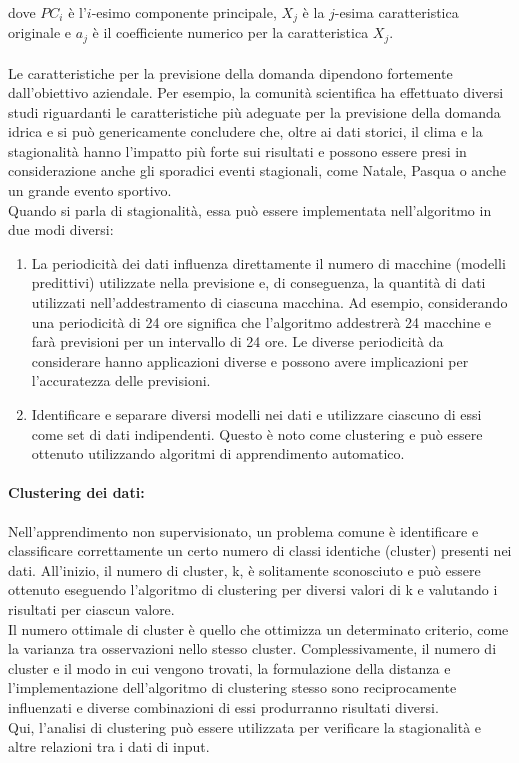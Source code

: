\documentclass[12pt,a4paper]{report}
\begin{document}
dove $PC_i$ è l'$i$-esimo componente principale, $X_j$ è la $j$-esima caratteristica originale e $a_j$ è il coefficiente numerico per la caratteristica $X_j$.\\
\\
Le caratteristiche per la previsione della domanda dipendono fortemente dall'obiettivo aziendale. Per esempio, la comunità scientifica ha effettuato diversi studi riguardanti le caratteristiche più adeguate per la previsione della domanda idrica \cite{antunes2018short} e si può genericamente concludere che, oltre ai dati storici, il clima e la stagionalità hanno l'impatto più forte sui risultati e possono essere presi in considerazione anche gli sporadici eventi stagionali, come Natale, Pasqua o anche un grande evento sportivo.\\
Quando si parla di stagionalità, essa può essere implementata nell'algoritmo in due modi diversi:
\begin{enumerate}
    \item La periodicità dei dati influenza direttamente il numero di macchine (modelli predittivi) utilizzate nella previsione e, di conseguenza, la quantità di dati utilizzati nell'addestramento di ciascuna macchina. Ad esempio, considerando una periodicità di 24 ore significa che l'algoritmo addestrerà 24 macchine e farà previsioni per un intervallo di 24 ore. Le diverse periodicità da considerare hanno applicazioni diverse e possono avere implicazioni per l'accuratezza delle previsioni.
    \item Identificare e separare diversi modelli nei dati e utilizzare ciascuno di essi come set di dati indipendenti. Questo è noto come clustering e può essere ottenuto utilizzando algoritmi di apprendimento automatico.
\end{enumerate}

\paragraph*{Clustering dei dati:}
Nell'apprendimento non supervisionato, un problema comune è identificare e classificare correttamente un certo numero di classi identiche (cluster) presenti nei dati. All'inizio, il numero di cluster, k, è solitamente sconosciuto e può essere ottenuto eseguendo l'algoritmo di clustering per diversi valori di k e valutando i risultati per ciascun valore.\\
Il numero ottimale di cluster è quello che ottimizza un determinato criterio, come la varianza tra osservazioni nello stesso cluster.
Complessivamente, il numero di cluster e il modo in cui vengono trovati, la formulazione della distanza e l'implementazione dell'algoritmo di clustering stesso sono reciprocamente influenzati e diverse combinazioni di essi produrranno risultati diversi.\\
Qui, l'analisi di clustering può essere utilizzata per verificare la stagionalità e altre relazioni tra i dati di input.\\
\\
\end{document}
